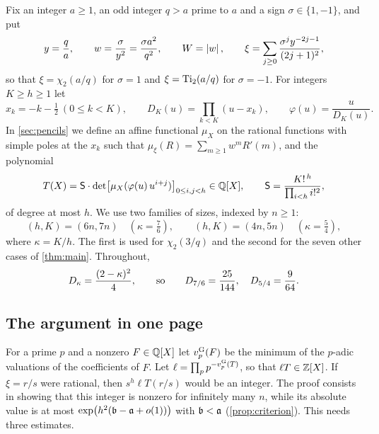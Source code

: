 Fix an integer $a\ge1$, an odd integer $q>a$ prime to $a$ and a sign $\sigma\in\{1,-1\}$, and
put
\begin{equation}\label{eq:basic-notation}
  y=\frac qa,\qquad w=\frac{\sigma}{y^2}=\frac{\sigma a^2}{q^2},\qquad W=\left\lvert w\right\rvert,\qquad
  \xi=\sum_{j\ge0}\frac{\sigma^jy^{-2j-1}}{(2j+1)^2},
\end{equation}
so that $\xi=\chi_2(a/q)$ for $\sigma=1$ and $\xi=\operatorname{Ti}_2(a/q)$ for $\sigma=-1$. For integers
$K\ge h\ge1$ let
\[
  x_k=-k-\tfrac12\ (0\le k<K),\qquad D_K(u)=\prod_{k<K}(u-x_k),\qquad
  \varphi(u)=\frac{u}{D_K(u)}.
\]
In \cref{sec:pencils} we define an affine functional $\mu_X$ on the rational functions with
simple poles at the $x_k$ such that $\mu_\xi(R)=\sum_{m\ge1}w^mR'(m)$, and the polynomial
\[
  T(X)=\mathsf{S}\cdot\det\bigl[\mu_X(\varphi(u)\,u^{i+j})\bigr]_{0\le i,j<h}\in\mathbb{Q}[X],
  \qquad \mathsf{S}=\frac{K!^{\,h}}{\prod_{i<h}i!^2},
\]
of degree at most $h$. We use two families of sizes, indexed by $n\ge1$:
\[
  (h,K)=(6n,7n)\quad(\kappa=\tfrac76),\qquad (h,K)=(4n,5n)\quad(\kappa=\tfrac54),
\]
where $\kappa=K/h$. The first is used for $\chi_2(3/q)$ and the second for the seven other
cases of \cref{thm:main}. Throughout,
\[
  D_\kappa=\frac{(2-\kappa)^2}{4},\qquad\text{so}\qquad D_{7/6}=\frac{25}{144},\quad
  D_{5/4}=\frac9{64}.
\]

\subsection{The argument in one page}\label{subsec:one-page}

For a prime $p$ and a nonzero $F\in\mathbb{Q}[X]$ let $v_{p}^{\mathrm{G}}(F)$ be the minimum of the $p$-adic
valuations of the coefficients of $F$. Let $\ell=\prod_pp^{-v_{p}^{\mathrm{G}}(T)}$, so that $\ell T\in\mathbb{Z}[X]$.
If $\xi=r/s$ were rational, then $s^h\ell T(r/s)$ would be an integer. The proof consists in
showing that this integer is nonzero for infinitely many $n$, while its absolute value is at
most $\exp\bigl(h^2(\mathfrak{b}-\mathfrak{a}+o(1))\bigr)$ with $\mathfrak{b}<\mathfrak{a}$
(\cref{prop:criterion}). This needs three estimates.

